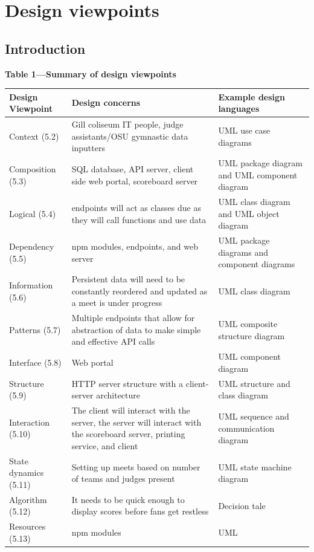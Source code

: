\documentclass[letterpaper,10pt,draftclsnofoot,onecolumn,]{article}
\begin{document}
\section{Design viewpoints}
\subsection{Introduction}
\begin{center}
\textbf{Table 1---Summary of design viewpoints}
\begin{tabular}{| p{10em} | p{20em} | p{20em} |}
\hline
\textbf{Design Viewpoint} & \textbf{Design concerns} & \textbf{Example design languages} \\
\hline
Context (5.2) & Gill coliseum IT people, judge assistants/OSU gymnastic data inputters & UML use case diagrams \\
\hline
Composition (5.3) & SQL database, API server, client side web portal, scoreboard server & UML package diagram and UML component diagram \\
\hline
Logical (5.4) & endpoints will act as classes due as they will call functions and use data & UML class diagram and UML object diagram \\
\hline
Dependency (5.5) & npm modules, endpoints, and web server & UML package diagrams and component diagrams \\
\hline
Information (5.6) & Persistent data will need to be constantly reordered and updated as a meet is under progress & UML class diagram\\
\hline
Patterns (5.7) & Multiple endpoints that allow for abstraction of data to make simple and effective API calls & UML composite structure diagram\\
\hline
Interface (5.8) & Web portal & UML component diagram\\
\hline
Structure (5.9) & HTTP server structure with a client-server architecture & UML structure and class diagram\\
\hline
Interaction (5.10) & The client will interact with the server, the server will interact with the scoreboard server, printing service, and client & UML sequence and communication diagram\\
\hline
State dynamics (5.11) & Setting up meets based on number of teams and judges present & UML state machine diagram\\
\hline
Algorithm (5.12) & It needs to be quick enough to display scores before fans get restless & Decision tale\\
\hline
Resources (5.13) & npm modules & UML\\
\hline
\end{tabular}
\end{center}
\end{document}
